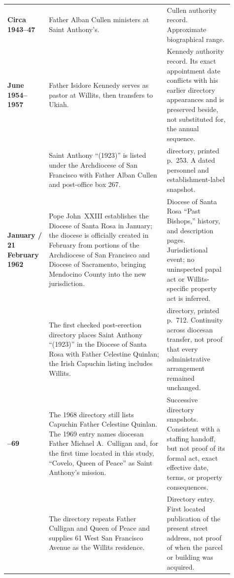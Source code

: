 \begin{longtable}{>{\bfseries\RaggedRight\arraybackslash}p{0.16\linewidth}>{\RaggedRight\arraybackslash}p{0.48\linewidth}>{\RaggedRight\arraybackslash}p{0.27\linewidth}}
Circa 1943--47 & Father Alban Cullen ministers at Saint Anthony's. & Cullen authority record. Approximate biographical range.\\

17 June 1954--1957 & Father Isidore Kennedy serves as pastor at Willits, then transfers to Ukiah. & Kennedy authority record. Its exact appointment date conflicts with his earlier directory appearances and is preserved beside, not substituted for, the annual sequence.\\

1960 & Saint Anthony ``(1923)'' is listed under the Archdiocese of San Francisco with Father Alban Cullen and post-office box 267. & 1960 directory, printed p.~253. A dated personnel and establishment-label snapshot.\\

13 January / 21 February 1962 & Pope John~XXIII establishes the Diocese of Santa Rosa in January; the diocese is officially created in February from portions of the Archdiocese of San Francisco and Diocese of Sacramento, bringing Mendocino County into the new jurisdiction. & Diocese of Santa Rosa ``Past Bishops,'' history, and description pages. Jurisdictional event; no uninspected papal act or Willits-specific property act is inferred.\\

1963 & The first checked post-erection directory places Saint Anthony ``(1923)'' in the Diocese of Santa Rosa with Father Celestine Quinlan; the Irish Capuchin listing includes Willits. & 1963 directory, printed p.~712. Continuity across diocesan transfer, not proof that every administrative arrangement remained unchanged.\\

1968--69 & The 1968 directory still lists Capuchin Father Celestine Quinlan. The 1969 entry names diocesan Father Michael A.~Culligan and, for the first time located in this study, ``Covelo, Queen of Peace'' as Saint Anthony's mission. & Successive directory snapshots. Consistent with a staffing handoff, but not proof of its formal act, exact effective date, terms, or property consequences.\\

1970 & The directory repeats Father Culligan and Queen of Peace and supplies 61 West San Francisco Avenue as the Willits residence. & Directory entry. First located publication of the present street address, not proof of when the parcel or building was acquired.\\


\end{longtable}
